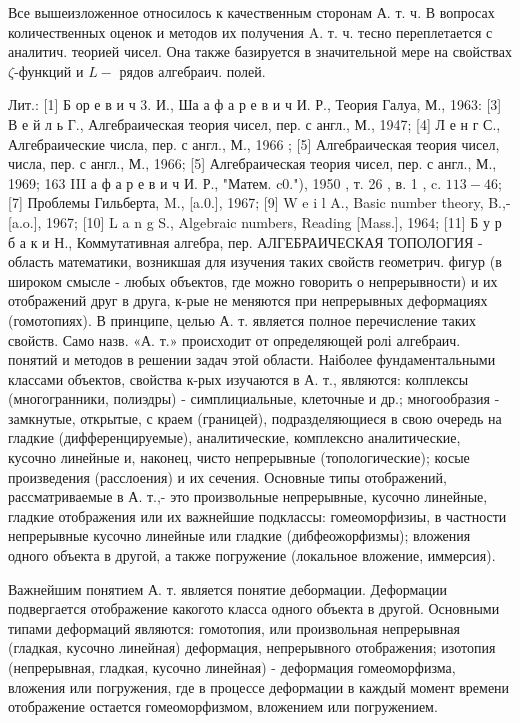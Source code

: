 \documentclass[10pt]{article}
\begin{document}
Все вышеизложенное относилось к качественным сторонам А. т. ч. В вопросах количественных оценок и методов их получения A. т. ч. тесно переплетается с аналитич. теорией чисел. Она также базируется в значительной мере на свойствах $\zeta$-функций и $L-$ рядов алгебраич. полей.



Лит.: [1] Б ор е в и ч 3. И., Ша а ф а р е в и ч И. Р., Теория Галуа, М., 1963: [3] В е й л ь Г., Алгебраическая теория чисел, пер. с англ., М., 1947; [4] Л е н г С., Алгебраические числа, пер. с англ., М., 1966 ; [5] Алгебраическая теория чисел, числа, пер. с англ., М., 1966; [5] Алгебраическая теория чисел, пер. с англ., М., 1969; 163 III а ф а р е в и ч И. Р., "Матем. c0."), 1950 , т. 26 , в. 1 , c. $113-46$; [7] Проблемы Гильберта, M., [a.0.], 1967; [9] W e i l A., Basic number theory, B.,- [a.o.], 1967; [10] L a n g S., Algebraic numbers, Reading [Mass.], 1964; [11] Б у р б а к и Н., Коммутативная алгебра, пер. АЛГЕБРАИЧЕСКАЯ ТОПОЛОГИЯ - область математики, возникшая для изучения таких свойств геометрич. фигур (в широком смысле - любых объектов, где можно говорить о непрерывности) и их отображений друг в друга, к-рые не меняются при непрерывных деформациях (гомотопиях). В принципе, целью А. т. является полное перечисление таких свойств. Само назв. «А. т.» происходит от определяющей ролі алгебраич. понятий и методов в решении задач этой области. Наіболее фундаментальными классами объектов, свойства к-рых изучаются в А. т., являются: колплексы (многогранники, полиэдры) - симплициальные, клеточные и др.; многообразия - замкнутые, открытые, с краем (границей), подразделяющиеся в свою очередь на гладкие (дифференцируемые), аналитические, комплексно аналитические, кусочно линейные и, наконец, чисто непрерывные (топологические); косые произведения (расслоения) и их сечения. Основные типы отображений, рассматриваемые в А. т.,- это произвольные непрерывные, кусочно линейные, гладкие отображения или их важнейшие подклассы: гомеоморфизиы, в частности непрерывные кусочно линейные или гладкие (дибфеожорфизмы); вложения одного объекта в другой, а также погружение (локальное вложение, иммерсия).



Важнейшим понятием А. т. является понятие дебормации. Деформации подвергается отображение какогото класса одного объекта в другой. Основными типами деформаций являются: гомотопия, или произвольная непрерывная (гладкая, кусочно линейная) деформация, непрерывного отображения; изотопия (непрерывная, гладкая, кусочно линейная) - деформация гомеоморфизма, вложения или погружения, где в процессе деформации в каждый момент времени отображение остается гомеоморфизмом, вложением или погружением.
\end{document}
